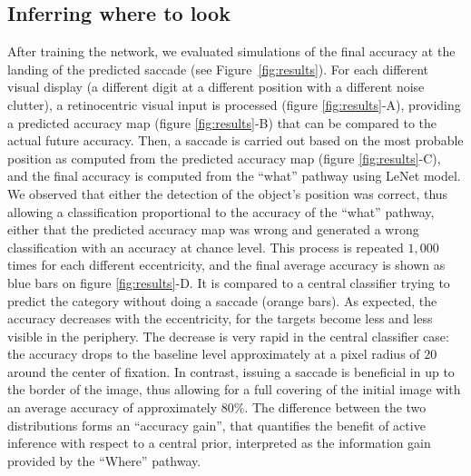 \subsection{Inferring where to look}
After training the network, we evaluated simulations of the final accuracy at the landing of the predicted saccade (see Figure~\ref{fig:results}). For each different visual display (a different digit at a different position with a different noise clutter), a retinocentric visual input is processed (figure \ref{fig:results}-A), providing a predicted accuracy map (figure \ref{fig:results}-B) that can be compared to the actual future accuracy. Then, a saccade is carried out based on the most probable position as computed from the predicted accuracy map (figure \ref{fig:results}-C), and the final accuracy is computed from the ``what'' pathway using LeNet model. We observed that either the detection of the object's position was correct, thus allowing a classification proportional to the accuracy of the ``what'' pathway, either that the predicted accuracy map was wrong and generated a wrong classification with an accuracy at chance level. 
This process is repeated $1,000$ times for each different eccentricity, and the final average accuracy is shown as blue bars on figure \ref{fig:results}-D. It is compared to a central classifier trying to predict the category without doing a saccade (orange bars). As expected, the accuracy decreases with the eccentricity, for the targets become less and less visible in the periphery. The decrease is very rapid in the central classifier case: the accuracy drops to the baseline level
approximately at a pixel radius of $20$ around the center of fixation. In contrast, issuing a saccade is beneficial in up to the border of the image, thus allowing for a full covering of the initial image with an average accuracy of approximately $80\%$. The difference between the two distributions forms an ``accuracy gain'', that quantifies the benefit of active inference with respect to a central prior, interpreted as the information gain provided by the ``Where'' pathway.

